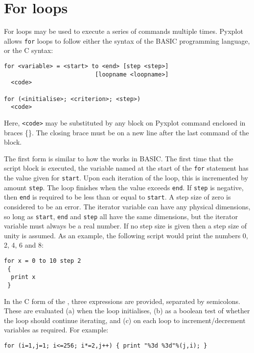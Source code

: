 \section{For loops}

For loops may be used to execute a series of commands multiple times. Pyxplot
allows {\tt for} loops to follow either the syntax of the BASIC programming
language, or the C syntax:

\begin{verbatim}
for <variable> = <start> to <end> [step <step>]
                          [loopname <loopname>]
  <code>

for (<initialise>; <criterion>; <step>)
  <code>
\end{verbatim}

\noindent Here, {\tt <code>} may be substituted by any block on Pyxplot command
enclosed in braces \{\}. The closing brace must be on a new line after the last
command of the block.

The first form is similar to how the  works in BASIC.  The first
time that the script block is executed, the variable named at the start of the
{\tt for} statement has the value given for {\tt start}.  Upon each iteration
of the loop, this is incremented by amount {\tt step}. The loop finishes when
the value exceeds {\tt end}. If {\tt step} is negative, then {\tt end} is
required to be less than or equal to {\tt start}. A step size of zero is
considered to be an error.  The iterator variable can have any physical
dimensions, so long as {\tt start}, {\tt end} and {\tt step} all have the same
dimensions, but the iterator variable must always be a real number. If no step
size is given then a step size of unity is assumed.  As an example, the
following script would print the numbers 0, 2, 4, 6 and 8:

\begin{verbatim}
for x = 0 to 10 step 2
 {
  print x
 }
\end{verbatim}

In the C form of the , three expressions are provided, separated
by semicolons. These are evaluated (a) when the loop initialises, (b) as a
boolean test of whether the loop should continue iterating, and (c) on each
loop to increment/decrement variables as required. For example:

\begin{verbatim}
for (i=1,j=1; i<=256; i*=2,j++) { print "%3d %3d"%(j,i); }
\end{verbatim}

